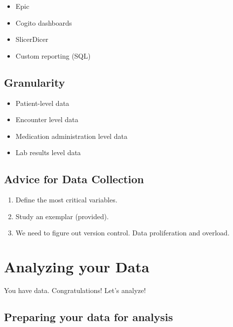 \documentclass[
]{report}
\providecommand{\tightlist}{%
  \setlength{\itemsep}{0pt}\setlength{\parskip}{0pt}}
\begin{document}
\begin{itemize}
\tightlist
\item
  Epic
\item
  Cogito dashboards
\item
  SlicerDicer
\item
  Custom reporting (SQL)
\end{itemize}

\hypertarget{granularity}{%
\section{Granularity}\label{granularity}}

\begin{itemize}
\tightlist
\item
  Patient-level data
\item
  Encounter level data
\item
  Medication administration level data
\item
  Lab results level data
\end{itemize}

\hypertarget{advice-for-data-collection}{%
\section{Advice for Data Collection}\label{advice-for-data-collection}}

\begin{enumerate}
\def\labelenumi{\arabic{enumi}.}
\item
  Define the most critical variables.
\item
  Study an exemplar (provided).
\item
  We need to figure out version control. Data proliferation and
  overload.
\end{enumerate}

\hypertarget{analyzing-your-data}{%
\chapter{Analyzing your Data}\label{analyzing-your-data}}

You have data. Congratulations! Let's analyze!

\hypertarget{preparing-your-data-for-analysis}{%
\section{Preparing your data for
analysis}\label{preparing-your-data-for-analysis}}
\end{document}
